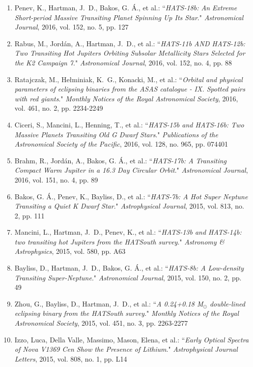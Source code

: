 \documentclass[12pt, a4paper]{article} %
\begin{document}
\begin{flushleft}
\begin{enumerate}
\item Penev, K., Hartman, J.~D., Bakos, G. Á., et al.: ``\textit{HATS-18b: An Extreme Short-period Massive Transiting Planet Spinning Up Its Star}." \textit{Astronomical Journal}, 2016, vol. 152, no. 5, pp. 127
\item Rabus, M., Jordán, A., Hartman, J.~D., et al.: ``\textit{HATS-11b AND HATS-12b: Two Transiting Hot Jupiters Orbiting Subsolar Metallicity Stars Selected for the K2 Campaign 7}." \textit{Astronomical Journal}, 2016, vol. 152, no. 4, pp. 88
\item Ratajczak, M., Hełminiak, K.~G., Konacki, M., et al.: ``\textit{Orbital and physical parameters of eclipsing binaries from the ASAS catalogue - IX. Spotted pairs with red giants}." \textit{Monthly Notices of the Royal Astronomical Society}, 2016, vol. 461, no. 2, pp. 2234-2249
\item Ciceri, S., Mancini, L., Henning, T., et al.: ``\textit{HATS-15b and HATS-16b: Two Massive Planets Transiting Old G Dwarf Stars}." \textit{Publications of the Astronomical Society of the Pacific}, 2016, vol. 128, no. 965, pp. 074401
\item Brahm, R., Jordán, A., Bakos, G. Á., et al.: ``\textit{HATS-17b: A Transiting Compact Warm Jupiter in a 16.3 Day Circular Orbit}." \textit{Astronomical Journal}, 2016, vol. 151, no. 4, pp. 89
\item Bakos, G. Á., Penev, K., Bayliss, D., et al.: ``\textit{HATS-7b: A Hot Super Neptune Transiting a Quiet K Dwarf Star}." \textit{Astrophysical Journal}, 2015, vol. 813, no. 2, pp. 111
\item Mancini, L., Hartman, J.~D., Penev, K., et al.: ``\textit{HATS-13b and HATS-14b: two transiting hot Jupiters from the HATSouth survey}." \textit{Astronomy \& Astrophysics}, 2015, vol. 580, pp. A63
\item Bayliss, D., Hartman, J.~D., Bakos, G. Á., et al.: ``\textit{HATS-8b: A Low-density Transiting Super-Neptune}." \textit{Astronomical Journal}, 2015, vol. 150, no. 2, pp. 49
\item Zhou, G., Bayliss, D., Hartman, J.~D., et al.: ``\textit{A 0.24+0.18 M$_\odot$ double-lined eclipsing binary from the HATSouth survey}." \textit{Monthly Notices of the Royal Astronomical Society}, 2015, vol. 451, no. 3, pp. 2263-2277
\item Izzo, Luca, Della Valle, Massimo, Mason, Elena, et al.: ``\textit{Early Optical Spectra of Nova V1369 Cen Show the Presence of Lithium}." \textit{Astrophysical Journal Letters}, 2015, vol. 808, no. 1, pp. L14

\end{enumerate}
\end{flushleft}
\end{document}
